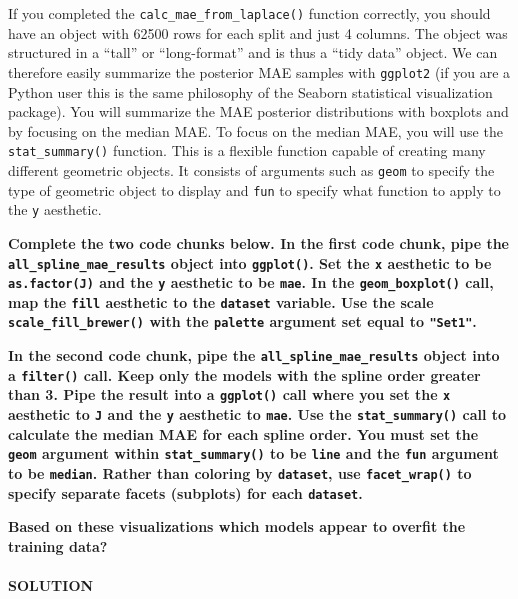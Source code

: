 \documentclass[
]{article}
\begin{document}
If you completed the \texttt{calc\_mae\_from\_laplace()} function
correctly, you should have an object with 62500 rows for each split and
just 4 columns. The object was structured in a ``tall'' or
``long-format'' and is thus a ``tidy data'' object. We can therefore
easily summarize the posterior MAE samples with \texttt{ggplot2} (if you
are a Python user this is the same philosophy of the Seaborn statistical
visualization package). You will summarize the MAE posterior
distributions with boxplots and by focusing on the median MAE. To focus
on the median MAE, you will use the \texttt{stat\_summary()} function.
This is a flexible function capable of creating many different geometric
objects. It consists of arguments such as \texttt{geom} to specify the
type of geometric object to display and \texttt{fun} to specify what
function to apply to the \texttt{y} aesthetic.

\textbf{Complete the two code chunks below. In the first code chunk,
pipe the \texttt{all\_spline\_mae\_results} object into
\texttt{ggplot()}. Set the \texttt{x} aesthetic to be
\texttt{as.factor(J)} and the \texttt{y} aesthetic to be \texttt{mae}.
In the \texttt{geom\_boxplot()} call, map the \texttt{fill} aesthetic to
the \texttt{dataset} variable. Use the scale
\texttt{scale\_fill\_brewer()} with the \texttt{palette} argument set
equal to \texttt{"Set1"}.}

\textbf{In the second code chunk, pipe the
\texttt{all\_spline\_mae\_results} object into a \texttt{filter()} call.
Keep only the models with the spline order greater than 3. Pipe the
result into a \texttt{ggplot()} call where you set the \texttt{x}
aesthetic to \texttt{J} and the \texttt{y} aesthetic to \texttt{mae}.
Use the \texttt{stat\_summary()} call to calculate the median MAE for
each spline order. You must set the \texttt{geom} argument within
\texttt{stat\_summary()} to be
\texttt{\textquotesingle{}line\textquotesingle{}} and the \texttt{fun}
argument to be \texttt{\textquotesingle{}median\textquotesingle{}}.
Rather than coloring by \texttt{dataset}, use \texttt{facet\_wrap()} to
specify separate facets (subplots) for each \texttt{dataset}.}

\textbf{Based on these visualizations which models appear to overfit the
training data?}

\hypertarget{solution-16}{%
\paragraph{SOLUTION}\label{solution-16}}
\end{document}
